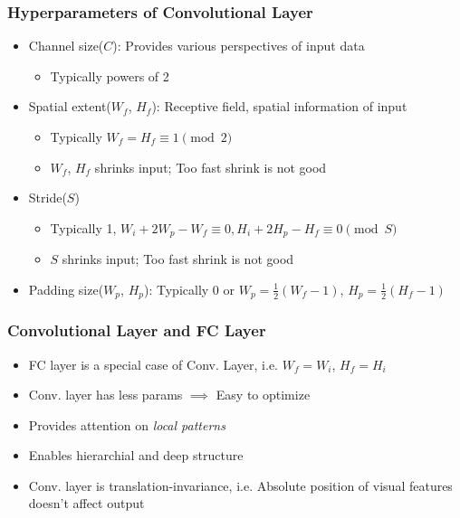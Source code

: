 \subsubsection*{Hyperparameters of Convolutional Layer}
\begin{itemize}
    \item Channel size($C$): Provides various perspectives of input data
    \begin{itemize}
        \item Typically powers of 2
    \end{itemize}
    \item Spatial extent($W_f$, $H_f$): Receptive field, spatial information of input
    \begin{itemize}
        \item Typically $W_f=H_f\equiv 1\pmod{2}$
        \item $W_f$, $H_f$ shrinks input; Too fast shrink is not good
    \end{itemize}
    \item Stride($S$)
    \begin{itemize}
        \item Typically 1, $W_i+2W_p-W_f\equiv 0,H_i+2H_p-H_f\equiv 0\pmod{S}$
        \item $S$ shrinks input; Too fast shrink is not good
    \end{itemize}
    \item Padding size($W_p$, $H_p$): Typically 0 or $W_p=\frac{1}{2}(W_f-1)$, $H_p=\frac{1}{2}(H_f-1)$
\end{itemize}

\subsubsection*{Convolutional Layer and FC Layer}
\begin{itemize}
    \item FC layer is a special case of Conv. Layer, i.e. $W_f=W_i$, $H_f=H_i$
    \item Conv. layer has less params $\implies$ Easy to optimize
    \item Provides attention on \textit{local patterns}
    \item Enables hierarchial and deep structure
    \item Conv. layer is translation-invariance, i.e. Absolute position of visual features doesn't affect output
\end{itemize}

